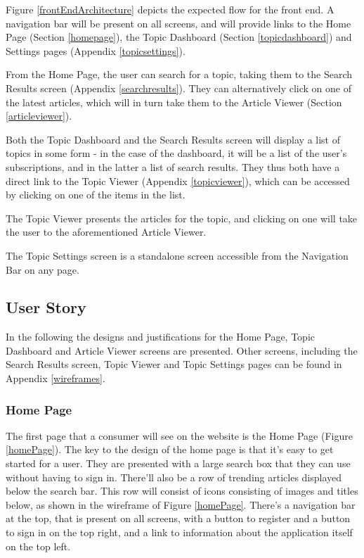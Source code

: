 \documentclass[12pt]{article}
\begin{document}
Figure \ref{frontEndArchitecture} depicts the expected flow for the front end. A navigation bar will be present on all screens, and will provide links to the Home Page (Section \ref{homepage}), the Topic Dashboard (Section \ref{topicdashboard}) and Settings pages (Appendix \ref{topicsettings}). 

From the Home Page, the user can search for a topic, taking them to the Search Results screen (Appendix \ref{searchresults}). They can alternatively click on one of the latest articles, which will in turn take them to the Article Viewer (Section \ref{articleviewer}).

Both the Topic Dashboard and the Search Results screen will display a list of topics in some form - in the case of the dashboard, it will be a list of the user's subscriptions, and in the latter a list of search results. They thus both have a direct link to the Topic Viewer (Appendix \ref{topicviewer}), which can be accessed by clicking on one of the items in the list.

The Topic Viewer presents the articles for the topic, and clicking on one will take the user to the aforementioned Article Viewer.

The Topic Settings screen is a standalone screen accessible from the Navigation Bar on any page.

\subsection{User Story}

\label{userstory}

In the following the designs and justifications for the Home Page, Topic Dashboard and Article Viewer screens are presented. Other screens, including the Search Results screen, Topic Viewer and Topic Settings pages can be found in Appendix \ref{wireframes}.

\subsubsection{Home Page}

The first page that a consumer will see on the website is the Home Page (Figure \ref{homePage}). The key to the design of the home page is that it's easy to get started for a user. They are presented with a large search box that they can use without having to sign in. There'll also be a row of trending articles displayed below the search bar. This row will consist of icons consisting of images and titles below, as shown in the wireframe of Figure \ref{homePage}. There's a navigation bar at the top, that is present on all screens, with a button to register and a button to sign in on the top right, and a link to information about the application itself on the top left.
\end{document}
